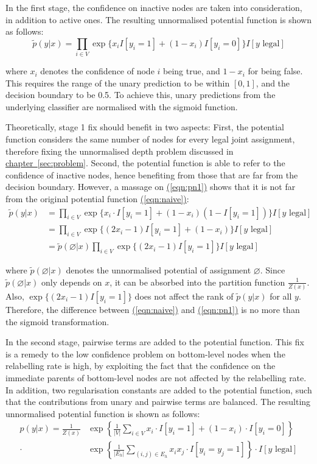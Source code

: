 \documentclass[11pt,a4paper]{book}
\begin{document}
In the first stage, the confidence on inactive nodes are taken into consideration, in addition to active ones. The resulting unnormalised potential function is shown as follows:
\begin{equation}
\tilde{p}(y|x)=\prod_{i\in V}\exp\{x_iI[y_i=1]+(1-x_i)I[y_i=0]\}I[y\text{ legal}]
\label{eqn:pn1}
\end{equation}

where $x_i$ denotes the confidence of node $i$ being true, and $1-x_i$ for being false. This requires the range of the unary prediction to be within $[0,1]$, and the decision boundary to be 0.5. To achieve this, unary predictions from the underlying classifier are normalised with the sigmoid function.

Theoretically, stage 1 fix should benefit in two aspects: First, the potential function considers the same number of nodes for every legal joint assignment, therefore fixing the unnormalised depth problem discussed in \hyperref[sec:problem]{chapter~\ref{sec:problem}}. Second, the potential function is able to refer to the confidence of inactive nodes, hence benefiting from those that are far from the decision boundary. However, a massage on \hyperref[eqn:pn1]{(\ref{eqn:pn1})} shows that it is not far from the original potential function \hyperref[eqn:naive]{(\ref{eqn:naive})}:
\begin{align}
\tilde{p}(y|x)&=\prod_{i\in V}\exp\{x_i\cdot I[y_i=1]+(1-x_i)(1-I[y_i=1])\}I[y\text{ legal}]\nonumber\\
&=\prod_{i\in V}\exp\{(2x_i-1)I[y_i=1]+(1-x_i)\}I[y\text{ legal}]\nonumber\\
&=\tilde{p}(\varnothing|x)\prod_{i\in V}\exp\{(2x_i-1)I[y_i=1]\}I[y\text{ legal}]
\label{eqn:pn2}
\end{align}

where $\tilde{p}(\varnothing|x)$ denotes the unnormalised potential of assignment $\varnothing$. Since $\tilde{p}(\varnothing|x)$ only depends on $x$, it can be absorbed into the partition function $\frac{1}{Z(x)}$. Also, $\exp\{(2x_i-1)I[y_i=1]\}$ does not affect the rank of $\tilde{p}(y|x)$ for all $y$. Therefore, the difference between \hyperref[eqn:naive]{(\ref{eqn:naive})} and \hyperref[eqn:pn1]{(\ref{eqn:pn1})} is no more than the sigmoid transformation.

In the second stage, pairwise terms are added to the potential function. This fix is a remedy to the low confidence problem on bottom-level nodes when the relabelling rate is high, by exploiting the fact that the confidence on the immediate parents of bottom-level nodes are not affected by the relabelling rate. In addition, two regularisation constants are added to the potential function, such that the contributions from unary and pairwise terms are balanced. The resulting unnormalised potential function is shown as follows:
\begin{align}
p(y|x)=\frac{1}{Z(x)}&\exp\left\{\frac{1}{|V|}\sum_{i\in V}x_i\cdot I[y_i=1]+(1-x_i)\cdot I[y_i=0]\right\}\nonumber\\
\cdot&\exp\left\{\frac{1}{|E_h|}\sum_{(i,j)\in E_h}x_ix_j\cdot I[y_i=y_j=1]\right\}\cdot I[y\text{ legal}]
\end{align}
\end{document}
